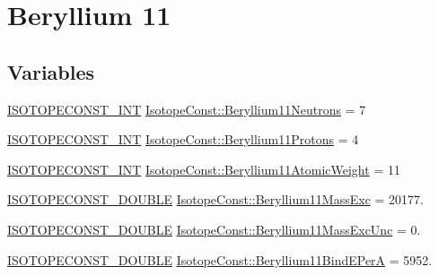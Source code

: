 \hypertarget{group___isotope_const-_beryllium-_be11}{}\section{Beryllium 11}
\label{group___isotope_const-_beryllium-_be11}
\subsection*{Variables}
\begin{DoxyCompactItemize}
\item 
\mbox{\hyperlink{group___isotope_const-_macros_ga5f18360b3e99483a35c32d789e62621c}{I\+S\+O\+T\+O\+P\+E\+C\+O\+N\+S\+T\+\_\+\+I\+NT}} \mbox{\hyperlink{group___isotope_const-_beryllium-_be11_ga0300b8323aa3920563715ee6f845d0f6}{Isotope\+Const\+::\+Beryllium11\+Neutrons}} = 7
\item 
\mbox{\hyperlink{group___isotope_const-_macros_ga5f18360b3e99483a35c32d789e62621c}{I\+S\+O\+T\+O\+P\+E\+C\+O\+N\+S\+T\+\_\+\+I\+NT}} \mbox{\hyperlink{group___isotope_const-_beryllium-_be11_ga20091d7adbfbb989afdb7dc48f198194}{Isotope\+Const\+::\+Beryllium11\+Protons}} = 4
\item 
\mbox{\hyperlink{group___isotope_const-_macros_ga5f18360b3e99483a35c32d789e62621c}{I\+S\+O\+T\+O\+P\+E\+C\+O\+N\+S\+T\+\_\+\+I\+NT}} \mbox{\hyperlink{group___isotope_const-_beryllium-_be11_gaaa17c98f1152f162a3418274a8cd260b}{Isotope\+Const\+::\+Beryllium11\+Atomic\+Weight}} = 11
\item 
\mbox{\hyperlink{group___isotope_const-_macros_ga8f45a7272ce02c0b4c65c44636ed719a}{I\+S\+O\+T\+O\+P\+E\+C\+O\+N\+S\+T\+\_\+\+D\+O\+U\+B\+LE}} \mbox{\hyperlink{group___isotope_const-_beryllium-_be11_ga4ae464d79a430e2e596828de55b8603c}{Isotope\+Const\+::\+Beryllium11\+Mass\+Exc}} = 20177.
\item 
\mbox{\hyperlink{group___isotope_const-_macros_ga8f45a7272ce02c0b4c65c44636ed719a}{I\+S\+O\+T\+O\+P\+E\+C\+O\+N\+S\+T\+\_\+\+D\+O\+U\+B\+LE}} \mbox{\hyperlink{group___isotope_const-_beryllium-_be11_gacc6c04fcd3e468e9c9140ecff73e669d}{Isotope\+Const\+::\+Beryllium11\+Mass\+Exc\+Unc}} = 0.
\item 
\mbox{\hyperlink{group___isotope_const-_macros_ga8f45a7272ce02c0b4c65c44636ed719a}{I\+S\+O\+T\+O\+P\+E\+C\+O\+N\+S\+T\+\_\+\+D\+O\+U\+B\+LE}} \mbox{\hyperlink{group___isotope_const-_beryllium-_be11_ga1dfd6a245d3dd06d769de592ba29aec9}{Isotope\+Const\+::\+Beryllium11\+Bind\+E\+PerA}} = 5952.
\item 

\end{DoxyCompactItemize}
